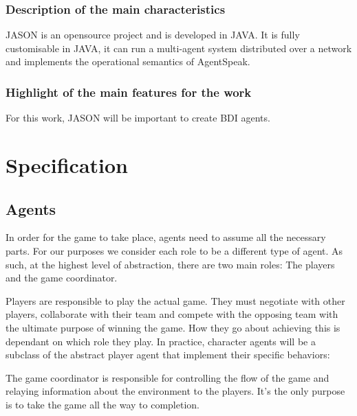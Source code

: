 \documentclass{article}
\begin{document}
\subsubsection{Description of the main characteristics}
JASON is an opensource project and is developed in JAVA. It is fully customisable in JAVA, it can run a multi-agent system distributed over a network and implements the operational semantics of AgentSpeak.
\subsubsection{Highlight of the main features for the work}
For this work, JASON will be important to create BDI agents. 
\section{Specification}

\subsection{Agents}
In order for the game to take place, agents need to assume all the necessary parts. For our purposes we consider each role to be a different type of agent. As such, at the highest level of abstraction, there are two main roles: The players and the game coordinator.

Players are responsible to play the actual game. They must negotiate with other players, collaborate with their team and compete with the opposing team with the ultimate purpose of winning the game. How they go about achieving this is dependant on which role they play. In practice, character agents will be a subclass of the abstract player agent that implement their specific behaviors:

The game coordinator is responsible for controlling the flow of the game and relaying information about the environment to the players. It's the only purpose is to take the game all the way to completion.
\end{document}

